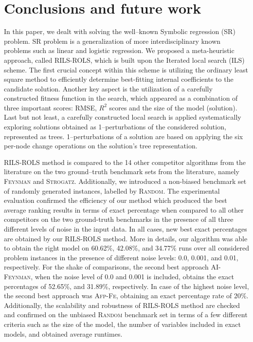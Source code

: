 \documentclass[a4paper,12pt]{elsarticle}
\begin{document}
\section{Conclusions and future work}\label{sec:conclusions}

In this paper, we dealt with solving the well--known Symbolic regression (SR)  problem. SR problem is a generalization of more interdisciplinary known problems such as linear and logistic regression.    
We proposed a meta-heuristic approach, called \textsc{RILS}-\textsc{ROLS}, which is built upon the Iterated local search (ILS) scheme. The first crucial concept within this scheme is utilizing the ordinary least square method to efficiently determine best-fitting internal coefficients to the candidate solution. %
Another key aspect is the utilization of a carefully constructed fitness function in the search, which appeared as a combination of three important scores: RMSE, $R^2$  scores and the size of the model (solution).  Last but not least, a carefully constructed local search is applied systematically exploring solutions obtained as 1--perturbations of the considered solution, represented as trees.  1--perturbations of a solution are based on applying the six per-node change operations on the solution's tree representation. 

\textsc{RILS-ROLS} method is compared to the 14 other competitor algorithms from the literature on the two ground--truth benchmark sets from the literature, namely \textsc{Feynman} and \textsc{Strogatz}.  Additionally, we introduced a non-biased benchmark set of randomly generated instances, labelled by \textsc{Random}.  The experimental evaluation confirmed the efficiency of our method which produced the best average ranking results in terms of exact percentage when compared to all other competitors on the two ground-truth benchmarks in the presence of all three different levels of noise in the input data. In all cases, new best exact percentages are obtained by our \textsc{RILS-ROLS} method.   More in details,
our algorithm was able to obtain the right model on 60.62\%, 42.08\%, and 34.77\% runs over all considered problem instances in the presence of different noise levels: 0.0, 0.001, and 0.01, respectively. For the shake of comparisons, the second best approach \textsc{AI-Feynman}, when the noise level of 0.0 and 0.001 is included, obtains the exact percentages of 52.65\%, and 31.89\%, respectively. In case of the highest noise level, the second best approach was \textsc{Afp-Fe}, obtaining an exact percentage rate of 20\%. Additionally, the scalability and robustness of \textsc{RILS}-\textsc{ROLS} method are checked and confirmed on the unbiased \textsc{Random} benchmark set in terms of a few different criteria such as the size of the model, the number of variables included in exact models, and obtained average runtimes. 
\end{document}
